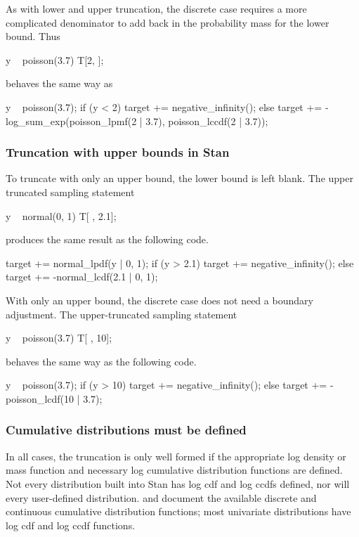 As with lower and upper truncation, the discrete case requires a more
complicated denominator to add back in the probability mass for the
lower bound.  Thus
%
\begin{stancode}
y ~ poisson(3.7) T[2, ];
\end{stancode}
%
behaves the same way as
%
\begin{stancode}
y ~ poisson(3.7);
if (y < 2)
  target += negative_infinity();
else
  target += -log_sum_exp(poisson_lpmf(2 | 3.7),
                         poisson_lccdf(2 | 3.7));
\end{stancode}


\subsubsection{Truncation with upper bounds in Stan}

To truncate with only an upper bound, the lower bound is left blank.
The upper truncated sampling statement
%
\begin{stancode}
y ~ normal(0, 1) T[ , 2.1];
\end{stancode}
%
produces the same result as the following code.
%
\begin{stancode}
target += normal_lpdf(y | 0, 1);
if (y > 2.1)
  target += negative_infinity();
else
  target += -normal_lcdf(2.1 | 0, 1);
\end{stancode}

With only an upper bound, the discrete case does not need a boundary
adjustment.  The upper-truncated sampling statement
%
\begin{stancode}
y ~ poisson(3.7) T[ , 10];
\end{stancode}
%
behaves the same way as the following code.
%
\begin{stancode}
y ~ poisson(3.7);
if (y > 10)
  target += negative_infinity();
else
  target += -poisson_lcdf(10 | 3.7);
\end{stancode}

\subsubsection{Cumulative distributions must be defined}

In all cases, the truncation is only well formed if the appropriate
log density or mass function and necessary log cumulative distribution
functions are defined.  Not every distribution built into Stan has log
cdf and log ccdfs defined, nor will every user-defined distribution.
 and
 document the available discrete
and continuous cumulative distribution functions; most univariate
distributions have log cdf and log ccdf functions.


